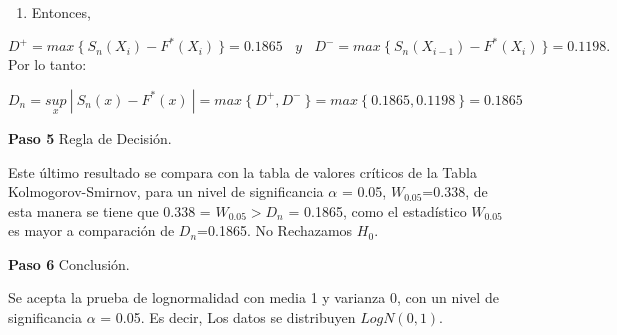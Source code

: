 \documentclass[
  a4paper,
  oneside,
  openany]{book}
\providecommand{\tightlist}{%
  \setlength{\itemsep}{0pt}\setlength{\parskip}{0pt}}
\begin{document}
\begin{enumerate}
\def\labelenumi{\arabic{enumi})}
\setcounter{enumi}{7}
\tightlist
\item
  Entonces,
\end{enumerate}

\[ D^+= max\ \{\ S_{n}(X_{i})-F^*(X_{i}) \ \}= 0.1865 \ \ \ \ y\ \ \ \ D^-= max\ \{\ S_{n}(X_{i-1})-F^*(X_{i})\ \}=0.1198.\]
Por lo tanto:

\[D_{n}=\underset{x}{sup}\ | \ S_{n}(x)-F^*(x) \ |=max \ \{ \ D^+,D^- \ \}=max \ \{ \  0.1865,0.1198 \ \}=0.1865\]

\textbf{Paso 5} Regla de Decisión.

Este último resultado se compara con la tabla de valores críticos de la Tabla Kolmogorov-Smirnov, para un nivel de significancia \(\alpha\) = 0.05,
\(W_{0.05}\)=0.338, de esta manera se tiene que 0.338 = \(W_{0.05} > D_{n}\) = 0.1865, como el estadístico \(W_{0.05}\) es mayor a comparación de \(D_{n}\)=0.1865.
No Rechazamos \(H_0\).

\textbf{Paso 6} Conclusión.

Se acepta la prueba de lognormalidad con media 1 y varianza 0, con un nivel de significancia \(\alpha\) = 0.05. Es decir, Los datos se distribuyen \(LogN(0,1)\).
\end{document}
